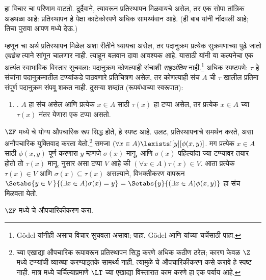 \documentclass[../../../include/open-logic-section]{subfiles}
\begin{document}
हा विचार \stagesinex{} चा परिणाम वाटतो. दुर्दैवाने, त्यावरून प्रतिस्थापन मिळवायचे असेल, तर एक सोपा तांत्रिक अडथळा आहे: प्रतिस्थापन हे  पेक्षा काटेकोरपणे अधिक सामर्थ्यवान आहे. (ही बाब \citet[\S13.2]{Potter2004} यांनी नोंदवली आहे; तिचा पुरावा आपण  मध्ये देऊ.)

म्हणून \stagesinex{} चा अर्थ प्रतिस्थापन मिळेल अशा रीतीने घ्यायचा असेल, तर पदानुक्रम प्रत्येक सुक्रमणाच्या पुढे जातो \emph{एवढेच} त्याने सांगून चालणार नाही. त्याहून बलवान दावा आवश्यक आहे. यासाठी \cite{Shoenfield:AST} यांनी या कल्पनेचा एक अत्यंत स्वाभाविक विस्तार सुचवला: पदानुक्रम कोणत्याही संचाशी \emph{सहअंतिम} नाही.\footnote{G\"odel यांनीही असाच विचार सुचवला असावा; \citet[p.~223]{Potter2004} पाहा. G\"odel आणि \citeauthor{Shoenfield:AST} यांच्या चर्चेसाठी \citet[90--5]{Incurvati2020} पाहा.} अधिक स्पष्टपणे: $\tau$ हे संचांना पदानुक्रमातील टप्प्यांकडे पाठवणारे प्रतिचित्रण असेल, तर कोणत्याही संच $A$ ची $\tau$ खालील प्रतिमा संपूर्ण पदानुक्रम संपवू शकत नाही. दुसऱ्या शब्दांत (रूपबंधाच्या स्वरूपात):
\begin{enumerate}
  \item[] \stagescofin. $A$ हा संच असेल आणि प्रत्येक $x \in A$ साठी $\tau(x)$ हा टप्पा असेल, तर प्रत्येक $x \in A$ च्या $\tau(x)$ नंतर येणारा एक टप्पा असतो.
\end{enumerate}
$\ZF$ मध्ये \stagescofin{} चे योग्य औपचारिक रूप सिद्ध होते, हे स्पष्ट आहे. उलट, \stagescofin{} प्रतिस्थापनाचे समर्थन करते, असा अनौपचारिक युक्तिवाद करता येतो.\footnote{\stagescofin{} च्या एखाद्या औपचारिक रूपावरून प्रतिस्थापन सिद्ध करणे अधिक कठीण ठरेल; कारण केवळ $\Z$ मध्ये टप्प्यांची व्याख्या करण्याइतके सामर्थ्य नाही. त्यामुळे \stagescofin{} चे औपचारिकीकरण कसे करावे हे स्पष्ट नाही. मात्र  मध्ये चर्चिल्याप्रमाणे $\LT$ च्या एखाद्या विस्तारात काम करणे हा एक पर्याय आहे.} समजा $(\forall x \in A)\lexists![y][\phi(x,y)]$. मग प्रत्येक $x \in A$ साठी $\phi(x,y)$ पूर्ण करणारा $y$ म्हणजे $\sigma(x)$ मानू, आणि $\sigma(x)$ पहिल्यांदा ज्या टप्प्यावर तयार होतो तो $\tau(x)$ मानू. \stagescofin{} नुसार असा टप्पा $V$ आहे की $(\forall x \in A)\tau(x)\in V$. आता प्रत्येक $\tau(x) \in V$ आणि $\sigma(x) \subseteq \tau(x)$ असल्याने, विभक्तीकरण वापरून $\Setabs{y
\in V}{(\exists x \in A)\sigma(x) = y} = \Setabs{y}{(\exists x \in
A)\phi(x,y)}$ हा संच मिळवता येतो.

\begin{prob}
  $\ZF$ मध्ये \stagescofin{} चे औपचारिकीकरण करा.
\end{prob}
\end{document}
